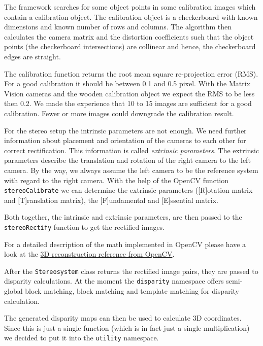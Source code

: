 \documentclass[11pt]{article}
\begin{document}
The framework searches for some object points  in some calibration images which contain a calibration object. The calibration object is a checkerboard with known dimensions and known number of rows and columns. The algorithm then calculates the camera matrix and the distortion coefficients such that the object points (the checkerboard intersections)  are collinear and hence, the checkerboard edges are straight.%

The calibration function returns the root mean square re-projection error (RMS). For a good calibration it should be between 0.1 and 0.5 pixel. With the Matrix Vision cameras and the wooden calibration object we expect the RMS to be less then 0.2. We made the experience that 10 to 15 images are sufficient for a good calibration. Fewer or more images could downgrade the calibration result. 


For the stereo setup the intrinsic parameters are not enough. We need further information about placement and orientation of the cameras to each other for correct rectification. This information is called \emph{extrinsic parameters}. The extrinsic parameters describe the translation and rotation of the right camera to the left camera. By the way, we always assume the left camera to be the reference system with regard to the right camera. With the help of the OpenCV function \texttt{stereoCalibrate} we can determine the extrinsic parameters ([R]otation matrix and [T]ranslation matrix), the [F]undamental and [E]ssential matrix.

Both together, the intrinsic and extrinsic parameters, are then passed to the \texttt{stereoRectify} function to get the rectified images.%

\bigskip
For a detailed description of the math implemented in OpenCV please have a look at the \href{http://docs.opencv.org/modules/calib3d/doc/camera_calibration_and_3d_reconstruction.html}{3D reconstruction reference from OpenCV}.
\bigskip

After the \texttt{Stereosystem} class returns the rectified image pairs, they are passed to disparity calculations. At the moment the \texttt{disparity} namespace offers semi-global block matching, block matching and template matching for disparity calculation.

The generated disparity maps can then be used to calculate 3D coordinates. Since this is just a single function (which is in fact just a single multiplication) we decided to put it into the \texttt{utility} namespace.
\end{document}
